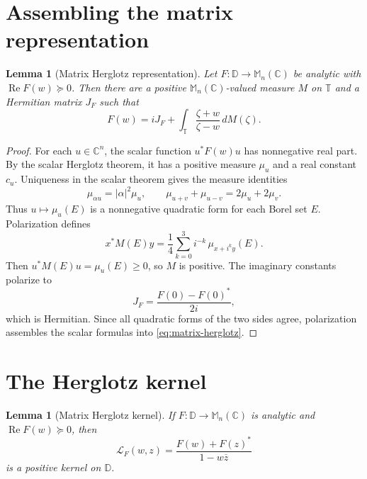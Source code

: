 \documentclass[11pt,oneside,openany]{book}
\newtheorem{lemma}[theorem]{Lemma}
\theoremstyle{definition}
\theoremstyle{remark}
\newcommand{\C}{\mathbb C}
\newcommand{\D}{\mathbb D}
\newcommand{\Torus}{\mathbb T}
\newcommand{\Mn}{\mathbb M_n(\C)}
\newcommand{\RePart}{\operatorname{Re}}
\begin{document}
\section{Assembling the matrix representation}

\begin{lemma}[Matrix Herglotz representation]
\label{lem:matrix-herglotz-representation}
Let \(F:\D\to\Mn\) be analytic with
\(\RePart F(w)\succeq0\).  Then there are a positive
\(\Mn\)-valued measure \(M\) on \(\Torus\) and a Hermitian matrix
\(J_F\) such that
\begin{equation}
  F(w)=iJ_F+
  \int_{\Torus}\frac{\zeta+w}{\zeta-w}\,dM(\zeta).
  \label{eq:matrix-herglotz}
\end{equation}
\end{lemma}

\begin{proof}
For each \(u\in\C^n\), the scalar function \(u^*F(w)u\) has
nonnegative real part.  By the scalar Herglotz theorem, it has a
positive measure \(\mu_u\) and a real constant \(c_u\).
Uniqueness in the scalar theorem gives the measure identities
\[
  \mu_{\alpha u}=|\alpha|^2\mu_u,
  \qquad
  \mu_{u+v}+\mu_{u-v}=2\mu_u+2\mu_v.
\]
Thus \(u\mapsto\mu_u(E)\) is a nonnegative quadratic form for each
Borel set \(E\).  Polarization defines
\begin{equation}
  x^*M(E)y=
  \frac14\sum_{k=0}^3 i^{-k}\,
  \mu_{x+i^ky}(E).
  \label{eq:measure-polarization}
\end{equation}
Then \(u^*M(E)u=\mu_u(E)\geq0\), so \(M\) is positive.  The imaginary
constants polarize to
\[
  J_F=\frac{F(0)-F(0)^*}{2i},
\]
which is Hermitian.  Since all quadratic forms of the two sides agree,
polarization assembles the scalar formulas into
\eqref{eq:matrix-herglotz}.
\end{proof}

\section{The Herglotz kernel}

\begin{lemma}[Matrix Herglotz kernel]
\label{lem:herglotz-kernel}
If \(F:\D\to\Mn\) is analytic and
\(\RePart F(w)\succeq0\), then
\begin{equation}
  \mathcal L_F(w,z)
  =\frac{F(w)+F(z)^*}{1-w\overline z}
  \label{eq:herglotz-kernel}
\end{equation}
is a positive kernel on \(\D\).
\end{lemma}
\end{document}
